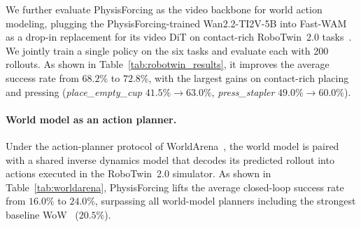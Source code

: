 We further evaluate PhysisForcing as the video backbone for world action modeling, plugging
the PhysisForcing-trained Wan2.2-TI2V-5B into Fast-WAM~\cite{yuan2026fastwam} as a drop-in
replacement for its video DiT on contact-rich RoboTwin~2.0 tasks~\cite{chen2025robotwin}.
We jointly train a single policy on the six tasks and evaluate each with 200 rollouts.
As shown in Table~\ref{tab:robotwin_results}, it improves the average success rate from
$68.2\%$ to $72.8\%$, with the largest gains on contact-rich placing and pressing
(\textit{place\_empty\_cup} $41.5\%\!\rightarrow\!63.0\%$, \textit{press\_stapler}
$49.0\%\!\rightarrow\!60.0\%$).

\paragraph{World model as an action planner.}
Under the action-planner protocol of WorldArena~\cite{shang2026worldarena}, the world model
is paired with a shared inverse dynamics model that decodes its predicted rollout into
actions executed in the RoboTwin~2.0 simulator. As shown in Table~\ref{tab:worldarena},
PhysisForcing lifts the average closed-loop success rate from $16.0\%$ to $24.0\%$,
surpassing all world-model planners including the strongest baseline WoW~\cite{chi2025wow}
($20.5\%$).

